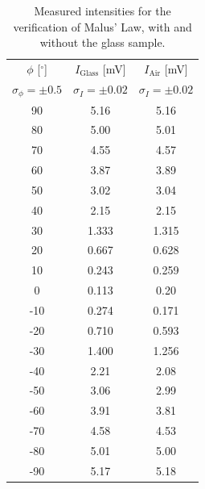 \documentclass[a4paper]{article}
\begin{document}
\begin{table}[H]
  \centering
  \begin{tabular}{c c c}
    \toprule
    {$\phi$ [$^\circ$]} & {$I_{\text{Glass}}$ [mV]} & {$I_{\text{Air}}$ [mV]} \\
    $\sigma_{\phi} = \pm 0.5$ & $\sigma_{I} = \pm 0.02$ & $\sigma_{I} = \pm 0.02$ \\
    \midrule
    90  & 5.16  & 5.16 \\
    80  & 5.00  & 5.01 \\
    70  & 4.55  & 4.57 \\
    60  & 3.87  & 3.89 \\
    50  & 3.02  & 3.04 \\
    40  & 2.15  & 2.15 \\
    30  & 1.333 & 1.315 \\
    20  & 0.667 & 0.628 \\
    10  & 0.243 & 0.259 \\
    0   & 0.113 & 0.20 \\
    -10 & 0.274 & 0.171 \\
    -20 & 0.710 & 0.593 \\
    -30 & 1.400 & 1.256 \\
    -40 & 2.21  & 2.08 \\
    -50 & 3.06  & 2.99 \\
    -60 & 3.91  & 3.81 \\
    -70 & 4.58  & 4.53 \\
    -80 & 5.01  & 5.00 \\
    -90 & 5.17  & 5.18 \\
    \bottomrule
  \end{tabular}
  \caption{Measured intensities for the verification of Malus' Law, with and without the glass sample.}\label{tab:malus_measurements}
\end{table}
\end{document}
